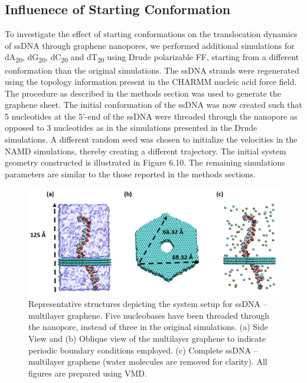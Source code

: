 \subsection[Influenece of Starting Conformation]{Influenece of Starting Conformation}
To investigate the effect of starting conformations on the translocation dynamics of ssDNA through graphene nanopores, we performed additional simulations for dA\textsubscript{20}, dG\textsubscript{20}, dC\textsubscript{20} and dT\textsubscript{20} using Drude polarizable FF, starting from a different conformation than the original simulations. The ssDNA strands were regenerated using the topology information present in the CHARMM nucleic acid force field.\supercite{baker_development_2011,savelyev_all-atom_2014} The procedure as described in the methods section was used to generate the graphene sheet. The initial conformation of the ssDNA was now created such that 5 nucleotides at the 5’-end of the ssDNA were threaded through the nanopore as opposed to 3 nucleotides as in the simulations presented in the Drude simulations. A different random seed was chosen to initialize the velocities in the NAMD simulations, thereby creating a different trajectory. The initial system geometry constructed is illustrated in Figure 6.10. The remaining simulations parameters are similar to the those reported in the methods sections.
\begin{figure}
    \centering
    \includegraphics[width=\textwidth]{Chapter4/Figures/Figure9.png}
    \caption[Representative structures depicting the system setup for ssDNA – multilayer graphene.]{Representative structures depicting the system setup for ssDNA – multilayer graphene. Five nucleobases have been threaded through the nanopore, instead of three in the original simulations. (a) Side View and (b) Oblique view of the multilayer graphene to indicate periodic boundary conditions employed. (c) Complete ssDNA – multilayer graphene (water molecules are removed for clarity). All figures are prepared using VMD.\supercite{humphrey_vmd_1996}}
\end{figure}

